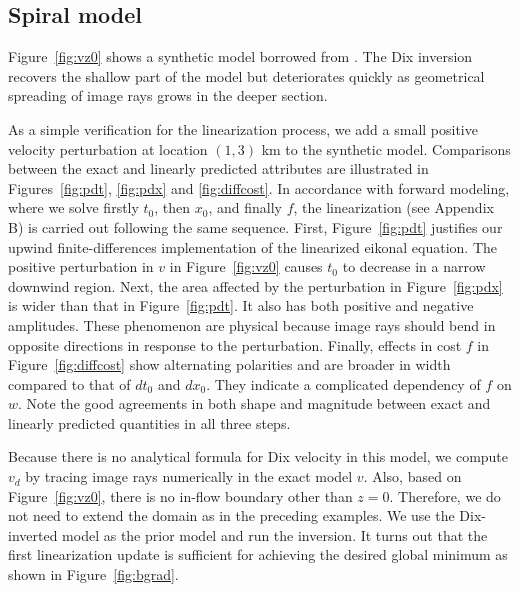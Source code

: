 \subsection{Spiral model}

Figure~\ref{fig:vz0} shows a synthetic model borrowed from \cite{cameron2}. The Dix inversion recovers the 
shallow part of the model but deteriorates quickly as geometrical spreading of image rays grows in the deeper 
section.

As a simple verification for the linearization process, we add a small positive velocity perturbation at location 
$(1,3)$ km to the synthetic model. Comparisons between the exact and linearly predicted attributes are 
illustrated in Figures~\ref{fig:pdt}, \ref{fig:pdx} and \ref{fig:diffcost}. In accordance with forward 
modeling, where we solve firstly $t_0$, then $x_0$, and finally $f$, the linearization (see Appendix B) is carried 
out following the same sequence. First, Figure~\ref{fig:pdt} justifies our upwind finite-differences 
implementation of the linearized eikonal equation. The positive perturbation in $v$ in Figure~\ref{fig:vz0} causes 
$t_0$ to decrease in a narrow downwind region. Next, the area affected by the perturbation in Figure~\ref{fig:pdx} 
is wider than that in Figure~\ref{fig:pdt}. It also has both positive and negative amplitudes. These phenomenon 
are physical because image rays should bend in opposite directions in response to the perturbation. Finally, 
effects in cost $f$ in Figure~\ref{fig:diffcost} show alternating polarities and are broader in width compared to 
that of $d t_0$ and $d x_0$. They indicate a complicated dependency of $f$ on $w$. Note the good agreements in 
both shape and magnitude between exact and linearly predicted quantities in all three steps.

Because there is no analytical formula for Dix velocity in this model, we compute $v_d$ by tracing image 
rays numerically in the exact model $v$. Also, based on Figure~\ref{fig:vz0}, there is no in-flow boundary other 
than $z = 0$. Therefore, we do not need to extend the domain as in the preceding examples. We 
use the Dix-inverted model as the prior model and run the inversion. It turns out that the first linearization 
update is sufficient for achieving the desired global minimum as shown in Figure~\ref{fig:bgrad}.

